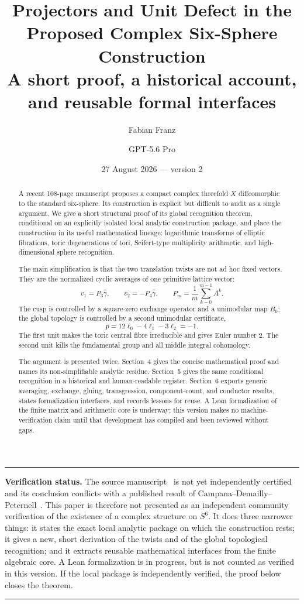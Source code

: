 \documentclass[11pt,reqno]{amsart}
\title[Projectors and unit defect for the proposed complex $S^6$]{Projectors and Unit Defect in the Proposed Complex Six-Sphere Construction\\[4pt]
\large A short proof, a historical account, and reusable formal interfaces}
\author{Fabian Franz}
\author{GPT-5.6 Pro}
\date{27 August 2026 \;---\; version 2}
\numberwithin{equation}{section}
\newcommand{\wideg}{\widehat\gamma}
\theoremstyle{definition}
\newenvironment{statusnote}{%
  \begin{center}\begin{minipage}{0.94\textwidth}\small\hrule\vspace{0.7em}%
}{%
  \vspace{0.7em}\hrule\end{minipage}\end{center}%
}
\begin{document}
\begin{abstract}
A recent 108-page manuscript proposes a compact complex threefold $X$ diffeomorphic to the standard six-sphere. Its construction is explicit but difficult to audit as a single argument. We give a short structural proof of its global recognition theorem, conditional on an explicitly isolated local analytic construction package, and place the construction in its useful mathematical lineage: logarithmic transforms of elliptic fibrations, toric degenerations of tori, Seifert-type multiplicity arithmetic, and high-dimensional sphere recognition.

The main simplification is that the two translation twists are not ad hoc fixed vectors. They are the normalized cyclic averages of one primitive lattice vector:
\[
 v_1=P_3\wideg,\qquad v_2=-P_4\wideg,
 \qquad
 P_m=\frac1m\sum_{k=0}^{m-1}A^k.
\]
The cusp is controlled by a square-zero exchange operator and a unimodular map $B_0$; the global topology is controlled by a second unimodular certificate,
\[
 p=12\ell_0-4\ell_1-3\ell_2=-1.
\]
The first unit makes the toric central fibre irreducible and gives Euler number $2$. The second unit kills the fundamental group and all middle integral cohomology.

The argument is presented twice. Section~4 gives the concise mathematical proof and names its non-simplifiable analytic residue. Section~5 gives the same conditional recognition in a historical and human-readable register. Section~6 exports generic averaging, exchange, gluing, transgression, component-count, and conductor results, states formalization interfaces, and records lessons for reuse. A Lean formalization of the finite matrix and arithmetic core is underway; this version makes no machine-verification claim until that development has compiled and been reviewed without gaps.
\end{abstract}

\maketitle
\tableofcontents

\begin{statusnote}
\textbf{Verification status.}
The source manuscript~\cite{S6} is not yet independently certified and its conclusion conflicts with a published result of Campana--Demailly--Peternell~\cite{CDP20}. This paper is therefore not presented as an independent community verification of the existence of a complex structure on $S^6$. It does three narrower things: it states the exact local analytic package on which the construction rests; it gives a new, short derivation of the twists and of the global topological recognition; and it extracts reusable mathematical interfaces from the finite algebraic core. A Lean formalization is in progress, but is not counted as verified in this version. If the local package is independently verified, the proof below closes the theorem.
\end{statusnote}
\end{document}
